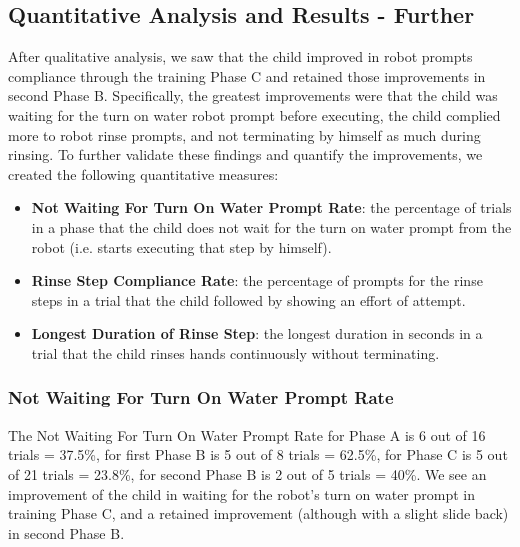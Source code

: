 \subsection{Quantitative Analysis and Results - Further}
After qualitative analysis, we saw that the child improved in robot prompts compliance through the training Phase C and retained those improvements in second Phase B.  Specifically, the greatest improvements were that the child was waiting for the turn on water robot prompt before executing, the child complied more to robot rinse prompts, and not terminating by himself as much during rinsing.  To further validate these findings and quantify the improvements, we created the following quantitative measures:
\begin{itemize}
	\item \textbf{Not Waiting For Turn On Water Prompt Rate}: the percentage of trials in a phase that the child does not wait for the turn on water prompt from the robot (i.e. starts executing that step by himself).
	\item \textbf{Rinse Step Compliance Rate}: the percentage of prompts for the rinse steps in a trial that the child followed by showing an effort of attempt.
	\item \textbf{Longest Duration of Rinse Step}: the longest duration in seconds in a trial that the child rinses hands continuously without terminating.
\end{itemize}

\subsubsection{Not Waiting For Turn On Water Prompt Rate}
The Not Waiting For Turn On Water Prompt Rate for Phase A is 6 out of 16 trials = 37.5\%, for first Phase B is 5 out of 8 trials = 62.5\%, for Phase C is 5 out of 21 trials = 23.8\%, for second Phase B is 2 out of 5 trials = 40\%.  We see an improvement of the child in waiting for the robot's turn on water prompt in training Phase C, and a retained improvement (although with a slight slide back) in second Phase B.


